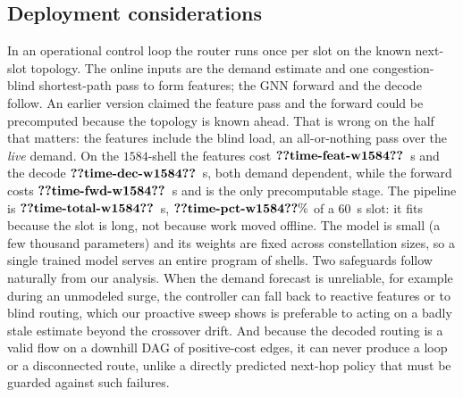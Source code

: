 \documentclass[journal]{IEEEtran}
\begin{document}
\subsection{Deployment considerations}\label{sec:deploy}
In an operational control loop the router runs once per slot on the known next-slot
topology. The online inputs are the demand estimate and one congestion-blind shortest-path pass to form features; the GNN forward and the decode follow. An earlier version claimed the feature pass and the forward could be precomputed because the topology is known ahead. That is wrong on the half that matters: the features include the blind load, an all-or-nothing pass over the \emph{live} demand. On the $1584$-shell the features cost $\clm{time-feat-w1584}$~s and the decode $\clm{time-dec-w1584}$~s, both demand dependent, while the forward costs $\clm{time-fwd-w1584}$~s and is the only precomputable stage. The pipeline is $\clm{time-total-w1584}$~s, $\clm{time-pct-w1584}\%$ of a $60$~s slot: it fits because the slot is long, not because work moved offline. The model is small (a
few thousand parameters) and its weights are fixed across constellation sizes, so a
single trained model serves an entire program of shells. Two safeguards follow naturally
from our analysis. When the demand forecast is unreliable, for example during an
unmodeled surge, the controller can fall back to reactive features or to blind routing,
which our proactive sweep shows is preferable to acting on a badly stale estimate beyond
the crossover drift. And because the decoded routing is a valid flow on a downhill DAG of
positive-cost edges, it can never produce a loop or a disconnected route, unlike a directly
predicted next-hop policy that must be guarded against such failures.
\end{document}
